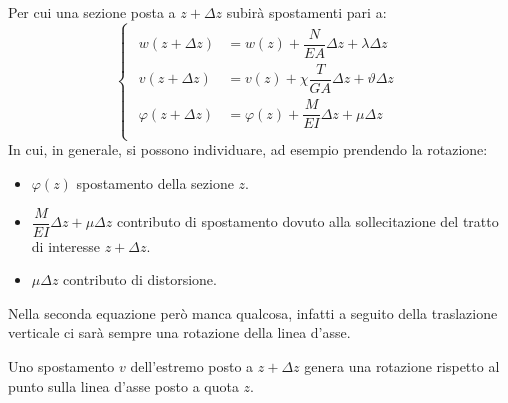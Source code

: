 \documentclass{article}
\begin{document}
\begin{adjustwidth}{2in}{}
			Per cui una sezione posta a $z+\Delta z$ subirà spostamenti pari a:
			\[
				\begin{cases}
					\begin{aligned}
						w(z+\Delta z) & = w(z) + \dfrac{N}{EA}\Delta z + \lambda\Delta z \\
						v(z+\Delta z) & = v(z) + \chi\dfrac{T}{GA}\Delta z + \vartheta\Delta z \\
						\varphi(z+\Delta z) & = \varphi(z) + \dfrac{M}{EI}\Delta z + \mu\Delta z \\
					\end{aligned}	
				\end{cases}
			\]
			In cui, in generale, si possono individuare, ad esempio prendendo la rotazione:
			\begin{itemize}
				\item $ \varphi(z) $ spostamento della sezione $z$.
				\item $\dfrac{M}{EI}\Delta z + \mu\Delta z$ contributo di spostamento dovuto alla sollecitazione del tratto di interesse $z+\Delta z$. 
				\item $\mu\Delta z$ contributo di distorsione.
			\end{itemize}
		
			Nella seconda equazione però manca qualcosa, infatti a seguito della traslazione verticale ci sarà sempre una rotazione della linea d'asse. \newline 
			
			Uno spostamento $v$ dell'estremo posto a $z+\Delta z$ genera una rotazione rispetto al punto sulla linea d'asse posto a quota $z$. \newline 
			

\end{adjustwidth}
\end{document}
